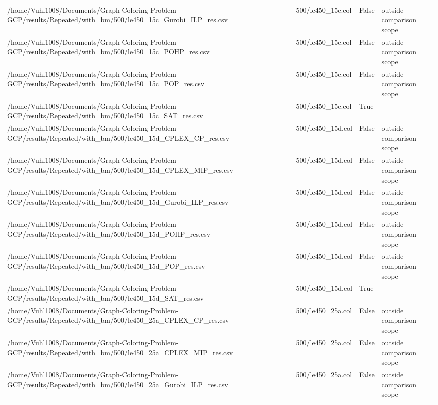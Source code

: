 \begin{table}[htbp]
\begin{tabular}{llll}
/home/Vuhl1008/Documents/Graph-Coloring-Problem-GCP/results/Repeated/with\_bm/500/le450\_15c\_Gurobi\_ILP\_res.csv & 500/le450\_15c.col & False & outside comparison scope \\
/home/Vuhl1008/Documents/Graph-Coloring-Problem-GCP/results/Repeated/with\_bm/500/le450\_15c\_POHP\_res.csv & 500/le450\_15c.col & False & outside comparison scope \\
/home/Vuhl1008/Documents/Graph-Coloring-Problem-GCP/results/Repeated/with\_bm/500/le450\_15c\_POP\_res.csv & 500/le450\_15c.col & False & outside comparison scope \\
/home/Vuhl1008/Documents/Graph-Coloring-Problem-GCP/results/Repeated/with\_bm/500/le450\_15c\_SAT\_res.csv & 500/le450\_15c.col & True & -- \\
/home/Vuhl1008/Documents/Graph-Coloring-Problem-GCP/results/Repeated/with\_bm/500/le450\_15d\_CPLEX\_CP\_res.csv & 500/le450\_15d.col & False & outside comparison scope \\
/home/Vuhl1008/Documents/Graph-Coloring-Problem-GCP/results/Repeated/with\_bm/500/le450\_15d\_CPLEX\_MIP\_res.csv & 500/le450\_15d.col & False & outside comparison scope \\
/home/Vuhl1008/Documents/Graph-Coloring-Problem-GCP/results/Repeated/with\_bm/500/le450\_15d\_Gurobi\_ILP\_res.csv & 500/le450\_15d.col & False & outside comparison scope \\
/home/Vuhl1008/Documents/Graph-Coloring-Problem-GCP/results/Repeated/with\_bm/500/le450\_15d\_POHP\_res.csv & 500/le450\_15d.col & False & outside comparison scope \\
/home/Vuhl1008/Documents/Graph-Coloring-Problem-GCP/results/Repeated/with\_bm/500/le450\_15d\_POP\_res.csv & 500/le450\_15d.col & False & outside comparison scope \\
/home/Vuhl1008/Documents/Graph-Coloring-Problem-GCP/results/Repeated/with\_bm/500/le450\_15d\_SAT\_res.csv & 500/le450\_15d.col & True & -- \\
/home/Vuhl1008/Documents/Graph-Coloring-Problem-GCP/results/Repeated/with\_bm/500/le450\_25a\_CPLEX\_CP\_res.csv & 500/le450\_25a.col & False & outside comparison scope \\
/home/Vuhl1008/Documents/Graph-Coloring-Problem-GCP/results/Repeated/with\_bm/500/le450\_25a\_CPLEX\_MIP\_res.csv & 500/le450\_25a.col & False & outside comparison scope \\
/home/Vuhl1008/Documents/Graph-Coloring-Problem-GCP/results/Repeated/with\_bm/500/le450\_25a\_Gurobi\_ILP\_res.csv & 500/le450\_25a.col & False & outside comparison scope \\

\end{tabular}
\end{table}
